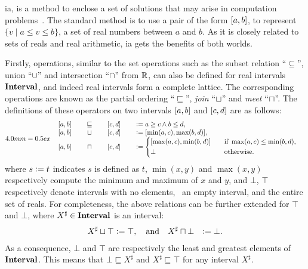 \Gls{ia}, is a method to enclose a set of solutions that may arise in
computation problems~\cite{moore}.  The standard method is to use a pair of the
form $\left[{a}, {b}\right]$, to represent $\{ v \mid a \leq v \leq b \}$, a set of
real numbers between $a$ and $b$.  As it is closely related to sets of reals
and real arithmetic, \gls{ia} gets the benefits of both worlds.

Firstly, operations, similar to the set operations such as the subset relation
``$\subseteq$'', union ``$\cup$'' and intersection ``$\cap$'' from $\mathbb{R}$,
can also be defined for real intervals $\mathbf{Interval}$, and indeed real
intervals form a complete lattice.  The corresponding operations are known
as the partial ordering ``$\sqsubseteq$'', \emph{join} ``$\sqcup$'' and
\emph{meet} ``$\sqcap$''.  The definitions of these operators on two intervals
$\left[{a}, {b}\right]$ and $\left[{c}, {d}\right]$ are as follows:
\begin{equation}
    \arraycolsep=0.5ex
    \begin{array}{lcll}
        \interval{a}{b} & \sqsubseteq & \interval{c}{d}
            &\defeq a \geq c \wedge b \leq d, \\
        \interval{a}{b} & \join & \interval{c}{d}
            &\defeq [\min(a, c), \max(b, d)], \\
        \interval{a}{b} & \meet & \interval{c}{d}
            &\defeq \left\{
                \begin{aligned}
                    & [\max(a, c), \min(b, d)] \quad &&
                        \text{if~} \max(a, c) \leq \min(b, d), \\
                    & \bot && \text{otherwise}.
                \end{aligned}
            \right.
    \end{array}\label{bg:eq:interval_relations}
\end{equation}
where $s \vcentcolon= t$ indicates $s$ is defined as $t$, $\min(x, y)$ and $\max(x,
y)$ respectively compute the minimum and maximum of $x$ and $y$, and $\bot$,
$\top$ respectively denote intervals with no elements, \ie~an empty interval,
and the entire set of reals.  For completeness, the above relations can be
further extended for $\top$ and $\bot$, where $X^\sharp \in \mathbf{Interval}$ is an
interval:
\begin{equation}
    \begin{aligned}
        X^\sharp \sqcup \top &\vcentcolon= \top, \quad \text{and} \quad
        X^\sharp \sqcap \bot &\vcentcolon= \bot.
    \end{aligned}
\end{equation}
As a consequence, $\bot$ and $\top$ are respectively the least and greatest
elements of $\mathbf{Interval}$.  This means that $\bot \sqsubseteq X^\sharp$ and
$X^\sharp \sqsubseteq \top$ for any interval $X^\sharp$.

